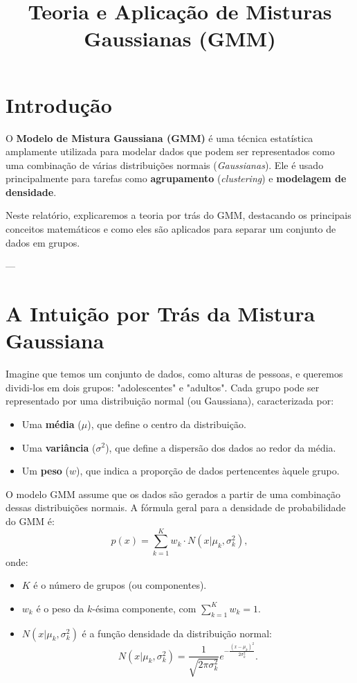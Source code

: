 \documentclass[a4paper,12pt]{article}
\title{Teoria e Aplicação de Misturas Gaussianas (GMM)}
\author{}
\date{}
\begin{document}
\maketitle

\section*{Introdução}
O \textbf{Modelo de Mistura Gaussiana (GMM)} é uma técnica estatística amplamente utilizada para modelar dados que podem ser representados como uma combinação de várias distribuições normais (\textit{Gaussianas}). Ele é usado principalmente para tarefas como \textbf{agrupamento} (\textit{clustering}) e \textbf{modelagem de densidade}. 

Neste relatório, explicaremos a teoria por trás do GMM, destacando os principais conceitos matemáticos e como eles são aplicados para separar um conjunto de dados em grupos.

---

\section*{A Intuição por Trás da Mistura Gaussiana}
Imagine que temos um conjunto de dados, como alturas de pessoas, e queremos dividi-los em dois grupos: "adolescentes" e "adultos". Cada grupo pode ser representado por uma distribuição normal (ou Gaussiana), caracterizada por:
\begin{itemize}
    \item Uma \textbf{média} ($\mu$), que define o centro da distribuição.
    \item Uma \textbf{variância} ($\sigma^2$), que define a dispersão dos dados ao redor da média.
    \item Um \textbf{peso} ($w$), que indica a proporção de dados pertencentes àquele grupo.
\end{itemize}

O modelo GMM assume que os dados são gerados a partir de uma combinação dessas distribuições normais. A fórmula geral para a densidade de probabilidade do GMM é:
\[
p(x) = \sum_{k=1}^K w_k \cdot N(x | \mu_k, \sigma_k^2),
\]
onde:
\begin{itemize}
    \item $K$ é o número de grupos (ou componentes).
    \item $w_k$ é o peso da $k$-ésima componente, com $\sum_{k=1}^K w_k = 1$.
    \item $N(x | \mu_k, \sigma_k^2)$ é a função densidade da distribuição normal:
    \[
    N(x | \mu_k, \sigma_k^2) = \frac{1}{\sqrt{2\pi\sigma_k^2}} e^{-\frac{(x - \mu_k)^2}{2\sigma_k^2}}.
    \]
\end{itemize}
\end{document}

